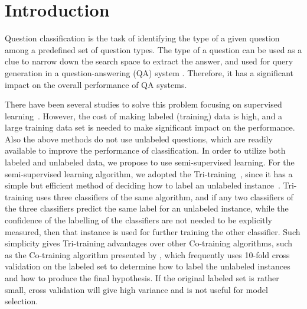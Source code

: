 \documentclass[english]{jnlp_1.4}
\begin{document}
\maketitle



\section{Introduction}

Question classification is the task of identifying the type of a given question among a predefined set of question types. The type of a question can be used as a clue to narrow down the search space to extract the answer, and used for query generation in a question-answering (QA) system \cite{Li02}. Therefore, it has a significant impact on the overall performance of QA systems.

There have been several studies to solve this problem focusing on
supervised learning~\cite{Dell03,Hacioglu03,Li02}. However, the
cost of making labeled (training) data is high, and a large
training data set is needed to make significant impact on the
performance. Also the above methods do not use unlabeled
questions, which are readily available to improve the performance
of classification. In order to utilize both labeled and unlabeled
data, we propose to use semi-supervised learning. For the
semi-supervised learning algorithm, we adopted the
Tri-training~\cite{Zhi05}, since it has a simple but efficient
method of deciding how to label an unlabeled
instance~\cite{Nguyen2006}. Tri-training uses three classifiers of
the same algorithm, and if any two classifiers of the three
classifiers predict the same label for an unlabeled instance,
while the confidence of the labelling of the classifiers are not
needed to be explicitly measured, then that instance is used for
further training the other classifier. Such simplicity gives
Tri-training advantages over other Co-training algorithms, such as
the Co-training algorithm presented by  \cite{Sally2000}, which
frequently uses 10-fold cross validation on the labeled set to
determine how to label the unlabeled instances and how to produce
the final hypothesis. If the original labeled set is rather small,
cross validation will give high variance and is not useful for
model selection.
\end{document}
